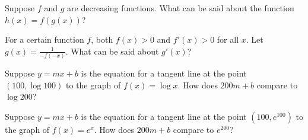 \documentclass{ximera}
\newcommand{\recommendation}[1]{}
\begin{document}
\begin{shuffle}
\begin{problem}
  Suppose $f$ and $g$ are decreasing functions.  What can be said about the function $h(x) = f(g(x))$?
  \begin{multipleChoice}
  \end{multipleChoice}
\end{problem}

\begin{problem}
  For a certain function $f$, both $f(x) > 0$ and $f'(x) > 0$ for all $x$.  Let $g(x) = \frac{1}{-f(-x)}$.  What can be said about $g'(x)$?
  \begin{multipleChoice}
  \end{multipleChoice}
\end{problem}



\begin{problem}
  Suppose $y = mx + b$ is the equation for a tangent line at the point $(100,\log 100)$ to the graph of $f(x) = \log x$.  How does $200m + b$ compare to $\log 200$?
  \begin{multipleChoice}
  \end{multipleChoice}
\end{problem}

\begin{problem}
  Suppose $y = mx + b$ is the equation for a tangent line at the point $(100,e^{100})$ to the graph of $f(x) = e^x$.  How does $200m + b$ compare to $e^{200}$?
  \begin{multipleChoice}
  \end{multipleChoice}
\end{problem}





\end{shuffle}
\end{document}
